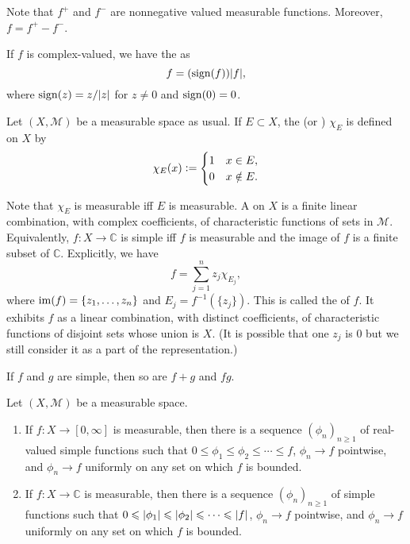 \documentclass[12pt]{article}	%
\begin{document}
Note that $f^{+}$ and $f^{-}$ are nonnegative valued measurable functions. Moreover, $f = f^{+} - f^{-}$. 

If $f$ is complex-valued, we have the  as
\begin{equation*} 
	f = (\operatorname{sign}(f)) {\left\lvert f \right\lvert},
\end{equation*}
where $\operatorname{sign}(z) = z/{\left\lvert z \right\lvert}$ for $z \neq 0$ and $\operatorname{sign}(0) = 0$. 

Let $(X, \mathcal{M})$ be a measurable space as usual. If $E \subset X$, the  (or )  $\chi_{E}$ is defined on $X$ by
\begin{equation*} 
	\chi_{E}(x) \vcentcolon= 
	\begin{cases}
		1 & x \in E, \\
		0 & x \notin E.
	\end{cases}
\end{equation*}

Note that $\chi_{E}$ is measurable iff $E$ is measurable. A  on $X$ is a finite linear combination, with complex coefficients, of characteristic functions of sets in $\mathcal{M}$. Equivalently, $f : X \to \mathbb{C}$ is simple iff $f$ is measurable and the image of $f$ is a finite subset of $\mathbb{C}$. Explicitly, we have
\begin{equation*} 
	f = \sum_{j = 1}^{n} z_{j} \chi_{E_{j}},
\end{equation*}
where $\operatorname{im}(f) = \{z_{1}, \ldots, z_{n}\}$ and $E_{j} = f^{-1}(\{z_{j}\})$. This is called the  of $f$. It exhibits $f$ as a linear combination, with distinct coefficients, of characteristic functions of disjoint sets whose union is $X$. (It is possible that one $z_{j}$ is $0$ but we still consider it as a part of the representation.)

\begin{exe}
	If $f$ and $g$ are simple, then so are $f + g$ and $fg$.
\end{exe}

\begin{thm}
	Let $(X, \mathcal{M})$ be a measurable space.
	\begin{enumerate}
		\item If $f : X \to [0, \infty]$ is measurable, then there is a sequence $(\phi_{n})_{n \ge 1}$ of real-valued simple functions such that $0 \le \phi_{1} \le \phi_{2} \le \cdots \le f$, $\phi_{n} \to f$ pointwise, and $\phi_{n} \to f$ uniformly on any set on which $f$ is bounded.
		\item If $f : X \to \mathbb{C}$ is measurable, then there is a sequence $(\phi_{n})_{n \ge 1}$ of simple functions such that $0 \leqslant {\left\lvert \phi_{1} \right\lvert} \leqslant {\left\lvert \phi_{2} \right\lvert} \leqslant \cdots \leqslant {\left\lvert f \right\lvert}$, $\phi_{n} \to f$ pointwise, and $\phi_{n} \to f$ uniformly on any set on which $f$ is bounded.
	\end{enumerate}
\end{thm}
\end{document}
